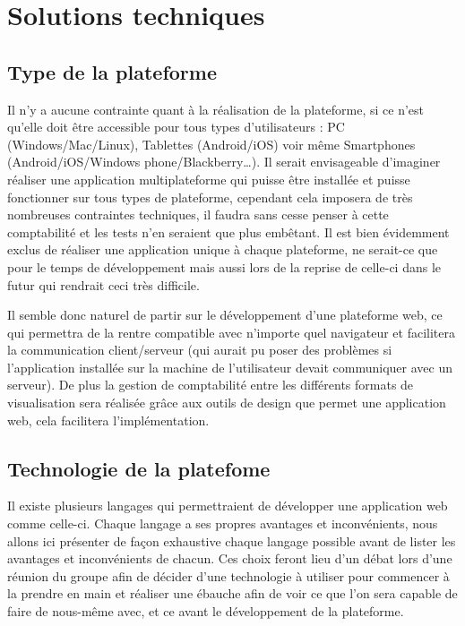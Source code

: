 \section{Solutions techniques}
\label{sec:technique}

    \subsection{Type de la plateforme}
    \label{subsec:plateforme}
    Il n’y a aucune contrainte quant à la réalisation de la plateforme, si ce n’est qu’elle doit être accessible
    pour tous types d’utilisateurs : PC (Windows/Mac/Linux), Tablettes (Android/iOS) voir même Smartphones
    (Android/iOS/Windows phone/Blackberry…). Il serait envisageable d’imaginer réaliser une application multiplateforme
    qui puisse être installée et puisse fonctionner sur tous types de plateforme, cependant cela imposera
    de très nombreuses contraintes techniques, il faudra sans cesse penser à cette comptabilité et les tests
    n’en seraient que plus embêtant. Il est bien évidemment exclus de réaliser une application unique à chaque plateforme,
    ne serait-ce que pour le temps de développement mais aussi lors de la reprise de celle-ci dans le futur qui rendrait
    ceci très difficile.

    Il semble donc naturel de partir sur le développement d’une plateforme web, ce qui permettra de la rentre compatible
    avec n’importe quel navigateur et facilitera la communication client/serveur (qui aurait pu poser des problèmes
    si l’application installée sur la machine de l’utilisateur devait communiquer avec un serveur). De plus la gestion
    de comptabilité entre les différents formats de visualisation sera réalisée grâce aux outils de design que permet
    une application web, cela facilitera l’implémentation.

    \subsection{Technologie de la platefome}
    \label{subsec:technologie}
    Il existe plusieurs langages qui permettraient de développer une application web comme celle-ci.
    Chaque langage a ses propres avantages et inconvénients, nous allons ici présenter de façon exhaustive
    chaque langage possible avant de lister les avantages et inconvénients de chacun. Ces choix feront lieu
    d’un débat lors d’une réunion du groupe afin de décider d’une technologie à utiliser pour commencer
    à la prendre en main et réaliser une ébauche afin de voir ce que l’on sera capable de faire de nous-même
    avec, et ce avant le développement de la plateforme.


